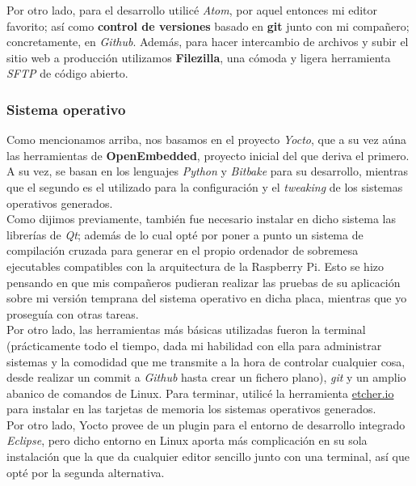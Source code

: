 \documentclass[13pt]{scrartcl}
\begin{document}
				Por otro lado, para el desarrollo utilicé \textit{Atom}, por aquel entonces mi editor favorito; así como \textbf{control de versiones} basado en \textbf{git} junto con mi compañero; concretamente, en \textit{Github}. Además, para hacer intercambio de archivos y subir el sitio web a producción utilizamos \textbf{Filezilla}, una cómoda y ligera herramienta \textit{SFTP} de código abierto.
				
			\subsubsection{Sistema operativo}
				Como mencionamos arriba, nos basamos en el proyecto \textit{Yocto}, que a su vez aúna las herramientas de \textbf{OpenEmbedded}, proyecto inicial del que deriva el primero. A su vez, se basan en los lenguajes \textit{Python} y \textit{Bitbake} para su desarrollo, mientras que el segundo es el utilizado para la configuración y el \textit{tweaking} de los sistemas operativos generados.\\
				
				Como dijimos previamente, también fue necesario instalar en dicho sistema las librerías de \textit{Qt}; además de lo cual opté por poner a punto un sistema de compilación cruzada para generar en el propio ordenador de sobremesa ejecutables compatibles con la arquitectura de la Raspberry Pi. Esto se hizo pensando en que mis compañeros pudieran realizar las pruebas de su aplicación sobre mi versión temprana del sistema operativo en dicha placa, mientras que yo proseguía con otras tareas.\\
				
				Por otro lado, las herramientas más básicas utilizadas fueron la terminal (prácticamente todo el tiempo, dada mi habilidad con ella para administrar sistemas y la comodidad que me transmite a la hora de controlar cualquier cosa, desde realizar un commit a \textit{Github} hasta crear un fichero plano), \textit{git} y un amplio abanico de comandos de Linux. Para terminar, utilicé la herramienta \href{https://etcher.io}{etcher.io} para instalar en las tarjetas de memoria los sistemas operativos generados.\\
				
				Por otro lado, Yocto provee de un plugin para el entorno de desarrollo integrado \textit{Eclipse}, pero dicho entorno en Linux aporta más complicación en su sola instalación que la que da cualquier editor sencillo junto con una terminal, así que opté por la segunda alternativa.
\end{document}
